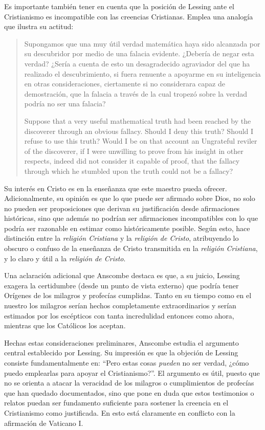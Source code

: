 Es importante también tener en cuenta que la posición de Lessing ante el
Cristianismo es incompatible con las creencias Cristianas. Emplea una analogía
que ilustra su actitud: \blockquote[Suppose that a very useful mathematical
truth had been reached by the discoverer through an obvious fallacy. \textelp{}
Should I deny this truth? Should I refuse to use this truth? Would I be on that
account an Ungrateful reviler of the discoverer, if I were unwilling to prove
from his insight in other respects, indeed did not consider it capable of proof,
that the fallacy through which he stumbled upon the truth could not be a
fallacy?]{Supongamos que una muy útil verdad matemática haya sido alcanzada por
  su descubridor por medio de una falacia evidente. \textelp{} ¿Debería de negar
  esta verdad? ¿Sería a cuenta de esto un desagradecido agraviador del que ha
  realizado el descubrimiento, si fuera renuente a apoyarme en su inteligencia
  en otras consideraciones, ciertamente si no considerara capaz de demostración,
  que la falacia a través de la cual tropezó sobre la verdad podría no ser una
  falacia?} Su interés en Cristo es en la enseñanza que este maestro pueda
ofrecer. Adicionalmente, su opinión es que lo que puede ser afirmado sobre Dios,
no solo no pueden ser proposiciones que derivan su justificación desde
afirmaciones históricas, sino que además no podrían ser afirmaciones
incompatibles con lo que podría ser razonable en estimar como históricamente
posible. Según esto, hace distinción entre la \emph{religión Cristiana} y la
\emph{religión de Cristo}, atribuyendo lo obscuro o confuso de la enseñanza de
Cristo transmitida en la \emph{religión Cristiana}, y lo claro y útil a la
\emph{religión de Cristo}.

Una aclaración adicional que Anscombe destaca es que, a su juicio, Lessing
exagera la certidumbre (desde un punto de vista externo) que podría tener
Orígenes de los milagros y profecías cumplidas. Tanto en su tiempo como en el
nuestro los milagros serían hechos completamente extraordinarios y serían
estimados por los escépticos con tanta incredulidad entonces como ahora,
mientras que los Católicos los aceptan.

Hechas estas consideraciones preliminares, Anscombe estudia el argumento central
establecido por Lessing. Su impresión es que la objeción de Lessing consiste
fundamentalmente en: \enquote{Pero estas cosas \emph{pueden} no ser verdad,
  ¿cómo puedo emplearlas para apoyar el Cristianismo?}. El argumento es útil,
puesto que no se orienta a atacar la veracidad de los milagros o cumplimientos
de profecías que han quedado documentados, sino que pone en duda que estos
testimonios o relatos puedan ser fundamento suficiente para sostener la creencia
en el Cristianismo como justificada. En esto está claramente en conflicto con la
afirmación de Vaticano I.

